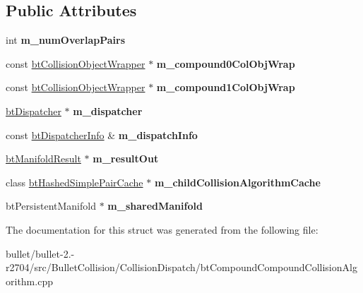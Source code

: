 \subsection*{Public Attributes}
\begin{DoxyCompactItemize}
\item 
\hypertarget{structbt_compound_compound_leaf_callback_a7920f4a20019f8e6511df436962c0f8b}{int {\bfseries m\+\_\+num\+Overlap\+Pairs}}\label{structbt_compound_compound_leaf_callback_a7920f4a20019f8e6511df436962c0f8b}

\item 
\hypertarget{structbt_compound_compound_leaf_callback_a4efbe0325172f7013bd641c1ef7fbefe}{const \hyperlink{structbt_collision_object_wrapper}{bt\+Collision\+Object\+Wrapper} $\ast$ {\bfseries m\+\_\+compound0\+Col\+Obj\+Wrap}}\label{structbt_compound_compound_leaf_callback_a4efbe0325172f7013bd641c1ef7fbefe}

\item 
\hypertarget{structbt_compound_compound_leaf_callback_a7edeb1b1d78eb7f9599a90ff4ee0bcd9}{const \hyperlink{structbt_collision_object_wrapper}{bt\+Collision\+Object\+Wrapper} $\ast$ {\bfseries m\+\_\+compound1\+Col\+Obj\+Wrap}}\label{structbt_compound_compound_leaf_callback_a7edeb1b1d78eb7f9599a90ff4ee0bcd9}

\item 
\hypertarget{structbt_compound_compound_leaf_callback_a4d91e085c30607f26cb08eccc9d60f24}{\hyperlink{classbt_dispatcher}{bt\+Dispatcher} $\ast$ {\bfseries m\+\_\+dispatcher}}\label{structbt_compound_compound_leaf_callback_a4d91e085c30607f26cb08eccc9d60f24}

\item 
\hypertarget{structbt_compound_compound_leaf_callback_a8d00af6087d90a98a9a34e116fc76152}{const \hyperlink{structbt_dispatcher_info}{bt\+Dispatcher\+Info} \& {\bfseries m\+\_\+dispatch\+Info}}\label{structbt_compound_compound_leaf_callback_a8d00af6087d90a98a9a34e116fc76152}

\item 
\hypertarget{structbt_compound_compound_leaf_callback_ae277b6f761a9c7fa509129db03ae88ea}{\hyperlink{classbt_manifold_result}{bt\+Manifold\+Result} $\ast$ {\bfseries m\+\_\+result\+Out}}\label{structbt_compound_compound_leaf_callback_ae277b6f761a9c7fa509129db03ae88ea}

\item 
\hypertarget{structbt_compound_compound_leaf_callback_a897184d28d2a4f71217459311bc0586a}{class \hyperlink{classbt_hashed_simple_pair_cache}{bt\+Hashed\+Simple\+Pair\+Cache} $\ast$ {\bfseries m\+\_\+child\+Collision\+Algorithm\+Cache}}\label{structbt_compound_compound_leaf_callback_a897184d28d2a4f71217459311bc0586a}

\item 
\hypertarget{structbt_compound_compound_leaf_callback_a06b4cccb2b7fa05a09f6674992c9dd1e}{bt\+Persistent\+Manifold $\ast$ {\bfseries m\+\_\+shared\+Manifold}}\label{structbt_compound_compound_leaf_callback_a06b4cccb2b7fa05a09f6674992c9dd1e}

\end{DoxyCompactItemize}


The documentation for this struct was generated from the following file\+:\begin{DoxyCompactItemize}
\item 
bullet/bullet-\/2.-\/r2704/src/\+Bullet\+Collision/\+Collision\+Dispatch/bt\+Compound\+Compound\+Collision\+Algorithm.\+cpp\end{DoxyCompactItemize}
